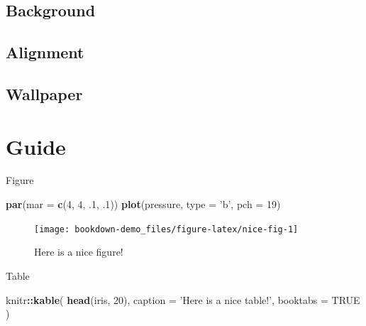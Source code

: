 \documentclass[
]{book}
\newenvironment{Shaded}{\begin{snugshade}}{\end{snugshade}}
\newcommand{\DataTypeTok}[1]{\textcolor[rgb]{0.13,0.29,0.53}{#1}}
\newcommand{\DecValTok}[1]{\textcolor[rgb]{0.00,0.00,0.81}{#1}}
\newcommand{\FloatTok}[1]{\textcolor[rgb]{0.00,0.00,0.81}{#1}}
\newcommand{\KeywordTok}[1]{\textcolor[rgb]{0.13,0.29,0.53}{\textbf{#1}}}
\newcommand{\NormalTok}[1]{#1}
\newcommand{\OperatorTok}[1]{\textcolor[rgb]{0.81,0.36,0.00}{\textbf{#1}}}
\newcommand{\OtherTok}[1]{\textcolor[rgb]{0.56,0.35,0.01}{#1}}
\newcommand{\StringTok}[1]{\textcolor[rgb]{0.31,0.60,0.02}{#1}}
\begin{document}
\hypertarget{background}{%
\section{Background}\label{background}}

\hypertarget{alignment}{%
\section{Alignment}\label{alignment}}

\hypertarget{wallpaper}{%
\section{Wallpaper}\label{wallpaper}}

\hypertarget{guide}{%
\chapter{Guide}\label{guide}}

Figure

\begin{Shaded}
\begin{Highlighting}[]
\KeywordTok{par}\NormalTok{(}\DataTypeTok{mar =} \KeywordTok{c}\NormalTok{(}\DecValTok{4}\NormalTok{, }\DecValTok{4}\NormalTok{, }\FloatTok{.1}\NormalTok{, }\FloatTok{.1}\NormalTok{))}
\KeywordTok{plot}\NormalTok{(pressure, }\DataTypeTok{type =} \StringTok{'b'}\NormalTok{, }\DataTypeTok{pch =} \DecValTok{19}\NormalTok{)}
\end{Highlighting}
\end{Shaded}

\begin{figure}

{\centering \texttt{[image: bookdown-demo\_files/figure-latex/nice-fig-1]} 

}

\caption{Here is a nice figure!}\label{fig:nice-fig}
\end{figure}

Table

\begin{Shaded}
\begin{Highlighting}[]
\NormalTok{knitr}\OperatorTok{::}\KeywordTok{kable}\NormalTok{(}
  \KeywordTok{head}\NormalTok{(iris, }\DecValTok{20}\NormalTok{), }\DataTypeTok{caption =} \StringTok{'Here is a nice table!'}\NormalTok{,}
  \DataTypeTok{booktabs =} \OtherTok{TRUE}
\NormalTok{)}
\end{Highlighting}
\end{Shaded}
\end{document}
